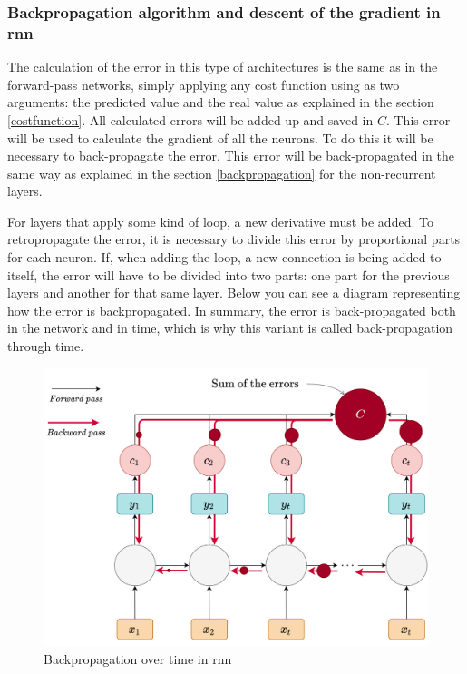 \subsubsection{Backpropagation 	algorithm and descent of the gradient in \acrshort{rnn}}
The calculation of the error in this type of architectures is the same as in the forward-pass networks, simply applying any cost function using as two arguments: the predicted value and the real value as explained in the section \ref{costfunction}. All calculated errors will be added up and saved in $C$. This error will be used to calculate the gradient of all the neurons. To do this it will be necessary to back-propagate the error. This error will be back-propagated in the same way as explained in the section \ref{backpropagation} for the non-recurrent layers.
\newline


For layers that apply some kind of loop, a new derivative must be added. To retropropagate the error, it is necessary to divide this error by proportional parts for each neuron. If, when adding the loop, a new connection is being added to itself, the error will have to be divided into two parts: one part for the previous layers and another for that same layer. Below you can see a diagram representing how the error is backpropagated. In summary, the error is back-propagated both in the network and in time, which is why this variant is called back-propagation through time.


\begin{figure}[H]
    \centering
    \includegraphics[width=14cm]{images/state-of-art/rnn/rnn-backward.png}
    \caption{Backpropagation over time in \acrshort{rnn}}
    \label{fig:Backpropagation_through_time}
\end{figure}

